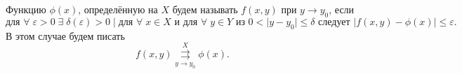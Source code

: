 \begin{col-answer-preambule}
	Функцию $\phi(x)$, определённую на $X$ будем называть  $f(x,y)$ при $y \to y_0$, если
	\begin{equation}
	\label{eq:lecture04-04}
	\text{для } \forall \; \varepsilon > 0 \; \exists \; \delta (\varepsilon) > 0 \; | \; \text{для } \forall \; x \in X \text{ и для } \forall \; y \in Y \text{ из } 0 < |y-y_0| \leqslant \delta \text{ следует } |f(x,y) - \phi(x)| \leqslant \varepsilon.
	\end{equation}
	В этом случае будем писать
	\begin{equation}
	\label{eq:lecture04-05}
	f(x,y) \overset{X}{\underset{y \to y_0}{\rightrightarrows}} \phi(x).
	\end{equation}
\end{col-answer-preambule}

